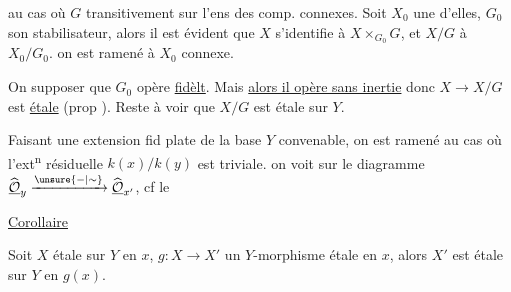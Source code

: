  au cas où $G$  transitivement sur l'ens des comp. connexes. Soit $X_0$  une d'elles, $G_0$ son stabilisateur, alors il est évident que $X$ s'identifie à $X\times_{G_0}G$, et $X/G$ à $X_0/G_0$.  on est ramené à $X_0$ connexe.


On  supposer que $G_0$ opère \uline{fidèlt}. Mais \uline{alors il opère sans inertie} donc $X\longrightarrow X/G$ est \uline{étale} (prop \unsure{--}). Reste à voir que $X/G$ est étale sur $Y$.

Faisant une extension fid plate de la base $Y$ convenable, on est ramené au cas où l'ext\textsuperscript{n} résiduelle $k(x)/k(y)$ est triviale.  on voit sur le diagramme $\widehat{\underline{\mathcal O}}_y\xrightarrow{\unsure{-|\sim}}\widehat{\underline{\mathcal O}}_{x'}$, cf le




\uline{Corollaire}

Soit $X$ étale sur $Y$ en $x$, $g:X\longrightarrow X'$ un $Y$-morphisme étale en $x$, alors $X'$ est étale sur $Y$ en $g(x)$.



